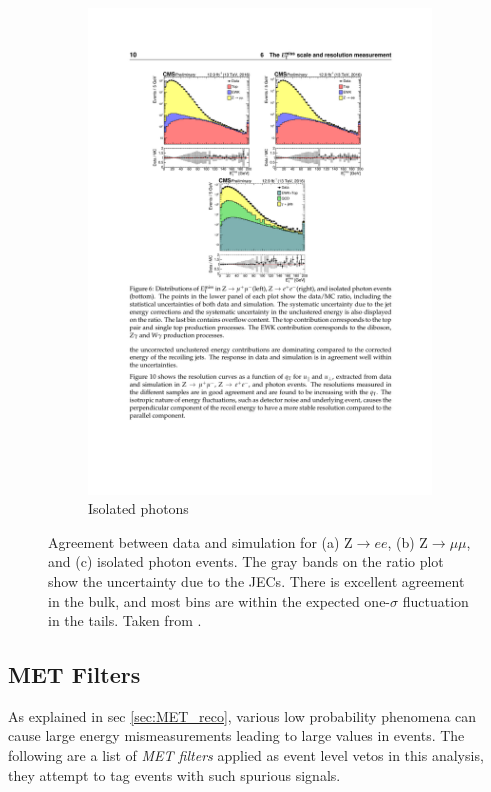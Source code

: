 \begin{figure}[!htb]
\begin{subfigure}[t]{0.31\textwidth}
          \includegraphics[width=\textwidth]{figures/met_resolution_gamma.pdf}
          \caption{Isolated photons}
          \label{fig:met_resolution_gamma}
        \end{subfigure}
        \caption{Agreement between data and simulation for (a) Z$\to ee$, (b) Z$\to \mu\mu$, and (c) isolated photon events. The gray bands on the ratio plot show the uncertainty due to the JECs. There is excellent agreement in the bulk, and most bins are within the expected one-$\sigma$ fluctuation in the tails. Taken from \cite{cms_met}.}
        \label{fig:met_resolution}
      \end{figure}

  \subsection{MET Filters} \label{sec:met_filters} 
    As explained in sec \ref{sec:MET_reco}, various low probability phenomena can cause large energy mismeasurements leading to large \MET values in events. The following are a list of \emph{MET filters} applied as event level vetos in this analysis, they attempt to tag events with such spurious signals.

